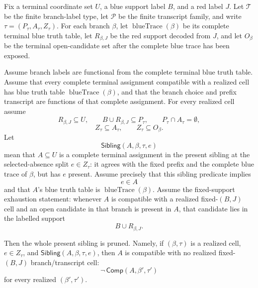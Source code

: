 \begin{helper}
Fix a terminal coordinate set \(U\), a blue support label \(B\), and a red
label \(J\).  Let \(\mathcal T\) be the finite branch-label type, let
\(\mathcal P\) be the finite transcript family, and write
\(\tau=(P_\tau,A_\tau,Z_\tau)\).  For each branch \(\beta\), let
\(\operatorname{blueTrace}(\beta)\) be its complete terminal blue truth
table, let \(R_{\beta,J}\) be the red support decoded from \(J\), and let
\(O_\beta\) be the terminal open-candidate set after the complete blue trace
has been exposed.

Assume branch labels are functional from the complete terminal blue truth
table.  Assume that every complete terminal assignment compatible with a
realized cell has blue truth table \(\operatorname{blueTrace}(\beta)\), and
that the branch choice and prefix transcript are functions of that complete
assignment.  For every realized cell assume
\[
R_{\beta,J}\subseteq U,\qquad
B\cup R_{\beta,J}\subseteq P_\tau,\qquad
P_\tau\cap A_\tau=\emptyset,
\]
\[
Z_\tau\subseteq A_\tau,\qquad Z_\tau\subseteq O_\beta .
\]
Let
\[
\mathsf{Sibling}(A,\beta,\tau,e)
\]
mean that \(A\subseteq U\) is a complete terminal assignment in the present
sibling at the selected-absence split \(e\in Z_\tau\): it agrees with the
fixed prefix and the complete blue trace of \(\beta\), but has \(e\) present.
Assume precisely that this sibling predicate implies
\[
e\in A
\]
and that \(A\)'s blue truth table is \(\operatorname{blueTrace}(\beta)\).
Assume the fixed-support exhaustion statement: whenever \(A\) is compatible
with a realized fixed-\((B,J)\) cell and an open candidate in that branch is
present in \(A\), that candidate lies in the labelled support
\[
B\cup R_{\beta,J}.
\]

Then the whole present sibling is pruned.  Namely, if \((\beta,\tau)\) is a
realized cell, \(e\in Z_\tau\), and
\(\mathsf{Sibling}(A,\beta,\tau,e)\), then \(A\) is compatible with no
realized fixed-\((B,J)\) branch/transcript cell:
\[
\neg\,\mathsf{Comp}(A,\beta',\tau')
\]
for every realized \((\beta',\tau')\).
\end{helper}
